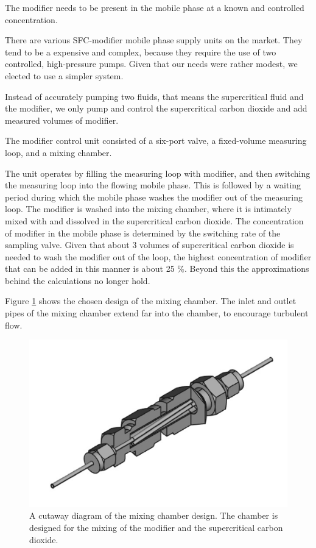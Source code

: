 The modifier needs to be present in the mobile phase at a known and controlled
concentration.

There are various SFC-modifier mobile phase supply units on the market. They
tend to be a expensive and complex, because they require the use of two
controlled, high-pressure pumps. Given that our needs were rather modest, we
elected to use a simpler system.

Instead of accurately pumping two fluids, that means the supercritical fluid
and the modifier, we only pump and control the supercritical carbon dioxide and
add measured volumes of modifier.

The modifier control unit consisted of a six-port valve, a fixed-volume
measuring loop, and a mixing chamber. 

The unit operates by filling the measuring loop with modifier, and then
switching the measuring loop into the flowing mobile phase. This is followed by
a waiting period during which the mobile phase washes the modifier out of the
measuring loop. The modifier is washed into the mixing chamber, where it is
intimately mixed with and dissolved in the supercritical carbon dioxide. The
concentration of modifier in the mobile phase is determined by the switching
rate of the sampling valve. Given that about 3 volumes of supercritical carbon
dioxide is needed to wash the modifier out of the loop, the highest
concentration of modifier that can be added in this manner is about 25 \%.
Beyond this the approximations behind the calculations no longer hold.

Figure \ref{fig:mixingchamber} shows the chosen design of the mixing chamber.
The inlet and outlet pipes of the mixing chamber extend far into the chamber, to
encourage turbulent flow. 

\begin{figure}
\centering
\includegraphics[width=\textwidth]{Figures/MixingChamber.png}
\decoRule

\caption[A cutaway diagram of the mixing chamber]{A cutaway diagram of the
mixing chamber design. The chamber is designed for the mixing of the modifier
and the supercritical carbon dioxide.}

\label{fig:mixingchamber}
\end{figure}

